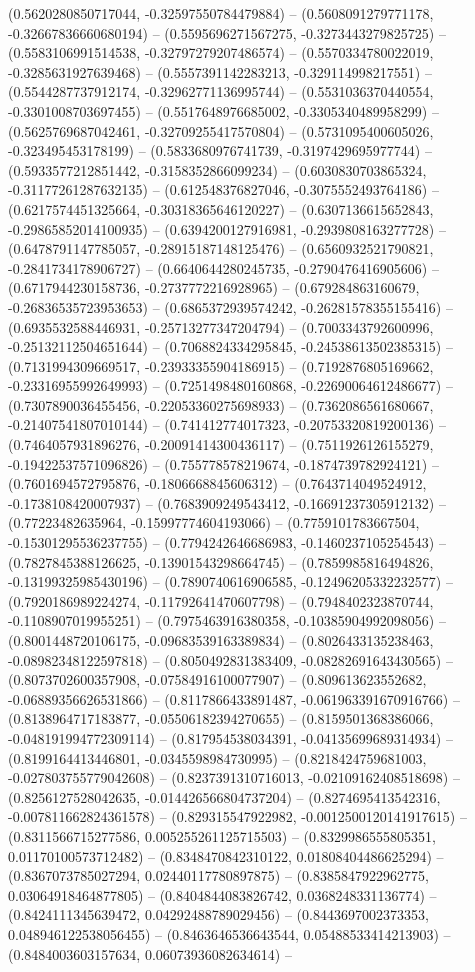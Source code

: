 (0.5620280850717044, -0.32597550784479884) -- (0.5608091279771178, -0.32667836660680194) -- (0.5595696271567275, -0.3273443279825725) -- (0.5583106991514538, -0.32797279207486574) -- (0.5570334780022019, -0.3285631927639468) -- (0.5557391142283213, -0.329114998217551) -- (0.5544287737912174, -0.32962771136995744) -- (0.5531036370440554, -0.3301008703697455) -- (0.5517648976685002, -0.3305340489958299) -- (0.5625769687042461, -0.32709255417570804) -- (0.5731095400605026, -0.323495453178199) -- (0.5833680976741739, -0.3197429695977744) -- (0.5933577212851442, -0.3158352866099234) -- (0.6030830703865324, -0.31177261287632135) -- (0.612548376827046, -0.3075552493764186) -- (0.6217574451325664, -0.30318365646120227) -- (0.6307136615652843, -0.29865852014100935) -- (0.6394200127916981, -0.2939808163277728) -- (0.6478791147785057, -0.28915187148125476) -- (0.6560932521790821, -0.2841734178906727) -- (0.6640644280245735, -0.2790476416905606) -- (0.6717944230158736, -0.2737772216928965) -- (0.679284863160679, -0.26836535723953653) -- (0.6865372939574242, -0.26281578355155416) -- (0.6935532588446931, -0.25713277347204794) -- (0.7003343792600996, -0.25132112504651644) -- (0.7068824334295845, -0.24538613502385315) -- (0.7131994309669517, -0.23933355904186915) -- (0.7192876805169662, -0.23316955992649993) -- (0.7251498480160868, -0.22690064612486677) -- (0.7307890036455456, -0.22053360275698933) -- (0.7362086561680667, -0.21407541807010144) -- (0.741412774017323, -0.20753320819200136) -- (0.7464057931896276, -0.20091414300436117) -- (0.7511926126155279, -0.19422537571096826) -- (0.755778578219674, -0.1874739782924121) -- (0.7601694572795876, -0.1806668845606312) -- (0.7643714049524912, -0.1738108420007937) -- (0.7683909249543412, -0.16691237305912132) -- (0.77223482635964, -0.15997774604193066) -- (0.7759101783667504, -0.15301295536237755) -- (0.7794242646686983, -0.1460237105254543) -- (0.7827845388126625, -0.13901543298664745) -- (0.7859985816494826, -0.13199325985430196) -- (0.7890740616906585, -0.12496205332232577) -- (0.7920186989224274, -0.11792641470607798) -- (0.7948402323870744, -0.1108907019955251) -- (0.7975463916380358, -0.10385904992098056) -- (0.8001448720106175, -0.09683539163389834) -- (0.8026433135238463, -0.08982348122597818) -- (0.8050492831383409, -0.08282691643430565) -- (0.8073702600357908, -0.07584916100077907) -- (0.809613623552682, -0.06889356626531866) -- (0.8117866433891487, -0.061963391670916766) -- (0.8138964717183877, -0.05506182394270655) -- (0.8159501368386066, -0.048191994772309114) -- (0.817954538034391, -0.04135699689314934) -- (0.8199164413446801, -0.0345598984730995) -- (0.8218424759681003, -0.027803755779042608) -- (0.8237391310716013, -0.02109162408518698) -- (0.8256127528042635, -0.014426566804737204) -- (0.8274695413542316, -0.007811662824361578) -- (0.829315547922982, -0.0012500120141917615) -- (0.8311566715277586, 0.005255261125715503) -- (0.8329986555805351, 0.01170100573712482) -- (0.8348470842310122, 0.01808404486625294) -- (0.8367073785027294, 0.02440117780897875) -- (0.8385847922962775, 0.03064918464877805) -- (0.8404844083826742, 0.0368248331136774) -- (0.8424111345639472, 0.04292488789029456) -- (0.8443697002373353, 0.048946122538056455) -- (0.8463646536643544, 0.05488533414213903) -- (0.8484003603157634, 0.06073936082634614) -- 